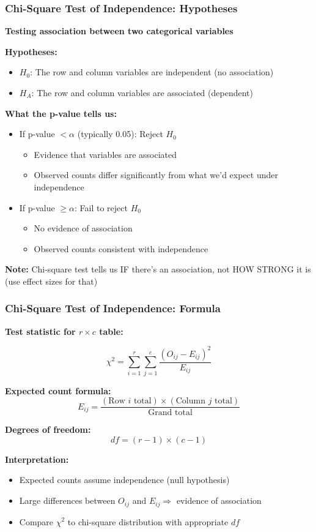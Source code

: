 \documentclass{beamer}
\begin{document}
\begin{frame}
\frametitle{Chi-Square Test of Independence: Hypotheses}
\textbf{Testing association between two categorical variables}

\vspace{0.5cm}
\textbf{Hypotheses:}
\begin{itemize}
\item $H_0$: The row and column variables are independent (no association)
\item $H_A$: The row and column variables are associated (dependent)
\end{itemize}

\vspace{0.5cm}
\textbf{What the p-value tells us:}
\begin{itemize}
\item If p-value $< \alpha$ (typically 0.05): Reject $H_0$
  \begin{itemize}
  \item Evidence that variables are associated
  \item Observed counts differ significantly from what we'd expect under independence
  \end{itemize}
\item If p-value $\geq \alpha$: Fail to reject $H_0$
  \begin{itemize}
  \item No evidence of association
  \item Observed counts consistent with independence
  \end{itemize}
\end{itemize}

\vspace{0.3cm}
\textbf{Note:} Chi-square test tells us IF there's an association, not HOW STRONG it is (use effect sizes for that)
\end{frame}

\begin{frame}
\frametitle{Chi-Square Test of Independence: Formula}
\textbf{Test statistic for $r \times c$ table:}

$$\chi^2 = \sum_{i=1}^{r} \sum_{j=1}^{c} \frac{(O_{ij} - E_{ij})^2}{E_{ij}}$$

\vspace{0.2cm}
\textbf{Expected count formula:}
$$E_{ij} = \frac{(\text{Row } i \text{ total}) \times (\text{Column } j \text{ total})}{\text{Grand total}}$$

\vspace{0.3cm}
\textbf{Degrees of freedom:}
$$df = (r - 1) \times (c - 1)$$

\vspace{0.3cm}
\textbf{Interpretation:}
\begin{itemize}\setlength\itemsep{-0.2em}
\item Expected counts assume independence (null hypothesis)
\item Large differences between $O_{ij}$ and $E_{ij} \Rightarrow$ evidence of association
\item Compare $\chi^2$ to chi-square distribution with appropriate $df$
\end{itemize}
\end{frame}
\end{document}
